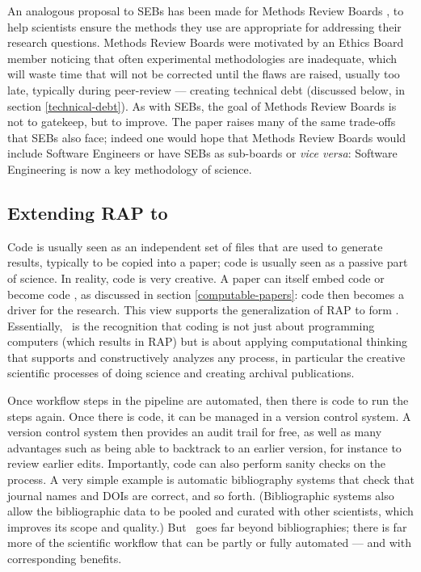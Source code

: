 \documentclass{comjnl}
\begin{document}
An analogous proposal to SEBs has been made for Methods Review Boards \cite{mrb}, to help scientists ensure the methods they use are appropriate for addressing their research questions. Methods Review Boards were motivated by an Ethics Board member noticing that often experimental methodologies are inadequate, which will waste time that will not be corrected until the flaws are raised, usually too late, typically during peer-review --- creating technical debt (discussed below, in section \ref{technical-debt}). As with SEBs, the goal of Methods Review Boards is not to gatekeep, but to improve. The paper \cite{mrb} raises many of the same trade-offs that SEBs also face; indeed one would hope that Methods Review Boards would include Software Engineers or have SEBs as sub-boards or \emph{vice versa\/}: Software Engineering is now a key methodology of science.   

\subsection{Extending RAP to \RAPstar}\label{RAPstar-section}
Code is usually seen as an independent set of files that are used to generate results, typically to be copied into a paper; code is usually seen as a passive part of science. In reality, code is very creative. A paper can itself embed code or become code , as discussed in section \ref{computable-papers}: code then becomes a driver for the research. This view supports the generalization of RAP to form \RAPstarp. Essentially, \RAPstar\ is the recognition that coding is not just about programming computers (which results in RAP) but is about applying computational thinking \cite{computational-thinking-wing,computational-thinking} that supports and constructively analyzes any process, in particular the creative scientific processes of doing science and creating archival publications.

Once workflow steps in the pipeline are automated, then there is code to run the steps again. Once there is code, it can be managed in a version control system. A version control system then provides an audit trail for free, as well as many advantages such as being able to backtrack to an earlier version, for instance to review earlier edits. Importantly, code can also perform sanity checks on the process. A very simple example is automatic bibliography systems that check that journal names and DOIs are correct, and so forth. (Bibliographic systems also allow the bibliographic data to be pooled and curated with other scientists, which improves its scope and quality.) But \RAPstar\ goes far beyond bibliographies; there is far more of the scientific workflow that can be partly or fully automated --- and with corresponding benefits.
\end{document}
